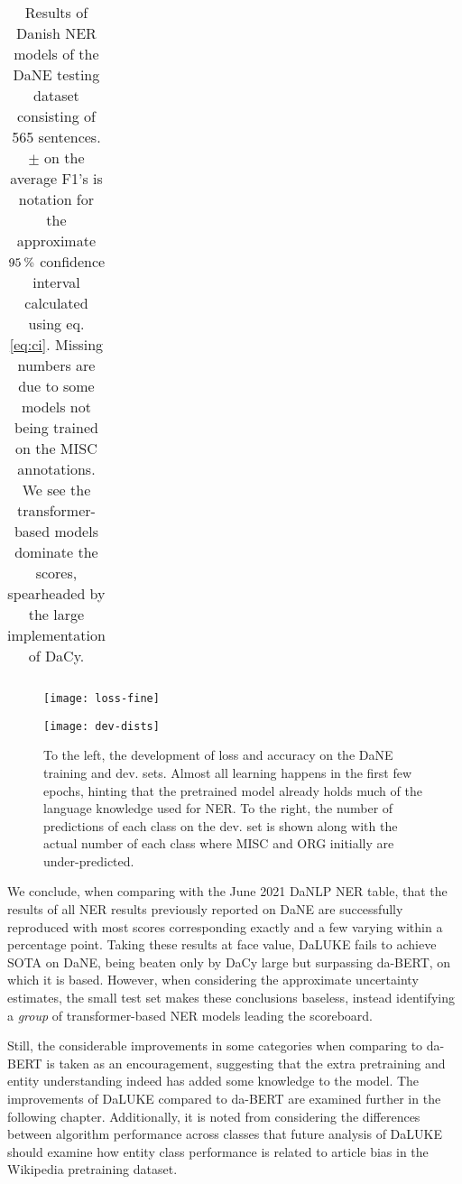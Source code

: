 \documentclass[main.tex]{subfiles}
\begin{document}
\begin{table}[H]
\begin{center}
\begin{tabular}{l l | c c c c | c c c c}
                \end{tabular}
        \end{center}
        \caption{
            Results of Danish NER models of the DaNE \cite{hvingelby2020dane} testing dataset consisting of 565 sentences.
            $\pm$ on the average F1's is notation for the approximate $95\:\text{\%{}}$ confidence interval calculated using eq. \eqref{eq:ci}.
        Missing numbers are due to some models not being trained on the MISC annotations.
        We see the transformer-based models dominate the scores, spearheaded by the large implementation of DaCy.
        }
        \label{tab:DaNE}
\end{table}\noindent

\begin{figure}[H]
    \centering
    \begin{minipage}{.49\textwidth}
        \texttt{[image: loss-fine]}
    \end{minipage}\hfill
    \begin{minipage}{.49\textwidth}
        \texttt{[image: dev-dists]}
    \end{minipage}
    \caption{
        To the left, the development of loss and accuracy on the DaNE training and dev. sets.
        Almost all learning happens in the first few epochs, hinting that the pretrained model already holds much of the language knowledge used for NER.
        To the right, the number of predictions of each class on the dev. set is shown along with the actual number of each class where MISC and ORG initially are under-predicted.
    }
    \label{fig:main-fine-tune}
\end{figure}\noindent
We conclude, when comparing with the June 2021 DaNLP NER table\footnotemark \cite{danlp2021}, that the results of all NER results previously reported on DaNE are successfully reproduced with most  scores corresponding exactly and a few varying within a percentage point.
Taking these results at face value, DaLUKE fails to achieve SOTA on DaNE, being beaten only by DaCy large but surpassing da-BERT, on which it is based.
However, when considering the approximate uncertainty estimates, the small test set makes these conclusions baseless, instead identifying a \emph{group} of transformer-based NER models leading the scoreboard.

Still, the considerable improvements in some categories when comparing to da-BERT is taken as an encouragement, suggesting that the extra pretraining and entity understanding indeed has added some knowledge to the model.
The improvements of DaLUKE compared to da-BERT are examined further in the following chapter.
Additionally, it is noted from considering the differences between algorithm performance across classes that future analysis of DaLUKE should examine how entity class performance is related to article bias in the Wikipedia pretraining dataset.
\end{document}
